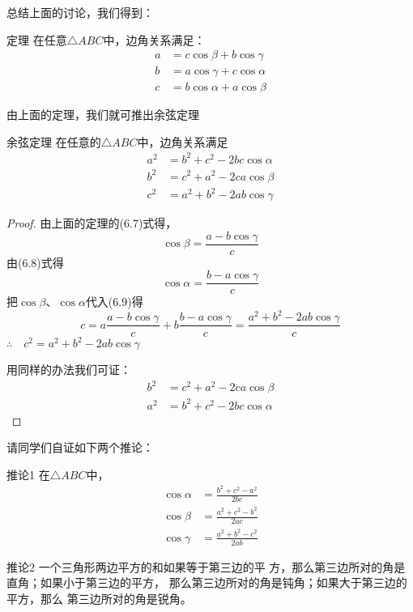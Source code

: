 总结上面的讨论，我们得到：

\begin{blk}
 {定理}
在任意$\triangle ABC$中，边角关系满足：
\begin{align}
 a&=c\cos\beta +b\cos\gamma\\
b&=a\cos\gamma+c\cos\alpha \\
c&=b\cos\alpha +a\cos\beta 
\end{align}  
\end{blk}

由上面的定理，我们就可推出余弦定理

\begin{blk}
    {余弦定理}
在任意的$\triangle ABC$中，边角关系满足
\[\begin{split}
  a^2&=b^2+c^2-2bc\cos\alpha\\
b^2&=c^2+a^2-2ca \cos\beta\\
c^2&=a^2+b^2-2ab\cos\gamma  
\end{split}\]
\end{blk}

\begin{proof}
    由上面的定理的(6.7)式得，
\[\cos\beta=\frac{a-b\cos\gamma}{c}\]
由(6.8)式得
\[\cos\alpha=\frac{b-a\cos\gamma}{c}\]
把$\cos\beta$、$\cos\alpha$代入(6.9)得
\[c=a\frac{a-b\cos\gamma}{c}+b\frac{b-a\cos\gamma}{c}=\frac{a^2+b^2-2ab\cos\gamma}{c}\]
$\therefore\quad c^2=a^2+b^2-2ab\cos\gamma$

用同样的办法我们可证：
\[\begin{split}
   b^2&=c^2+a^2-2ca \cos\beta\\ 
   a^2&=b^2+c^2-2bc\cos\alpha   
\end{split}\]
\end{proof}

请同学们自证如下两个推论：

\begin{blk}{推论1}
在$\triangle ABC$中，
\[\begin{split}
    \cos\alpha&=\frac{b^2+c^2-a^2}{2bc}\\
    \cos\beta&=\frac{a^2+c^2-b^2}{2ac}\\
        \cos\gamma&=\frac{a^2+b^2-c^2}{2ab}
\end{split}\]
\end{blk}

\begin{blk}{推论2}
     一个三角形两边平方的和如果等于第三边的平
方，那么第三边所对的角是直角；如果小于第三边的平方，
那么第三边所对的角是钝角；如果大于第三边的平方，那么
第三边所对的角是锐角。
\end{blk}


